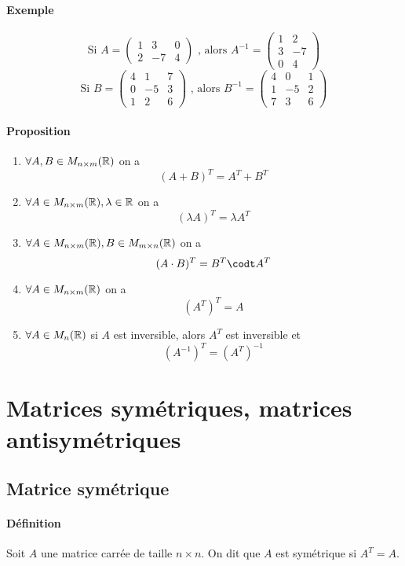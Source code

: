 \paragraph{Exemple}$$\text{Si } A=\begin{pmatrix}1&3&0\\2&-7&4\end{pmatrix}\text{ , alors }A^{-1}=\begin{pmatrix}1&2\\3&-7\\0&4\end{pmatrix}$$
$$\text{Si } B=\begin{pmatrix}4&1&7\\0&-5&3\\1&2&6\end{pmatrix}\text{ , alors }B^{-1}=\begin{pmatrix}4&0&1\\1&-5&2\\7&3&6\end{pmatrix}$$

\paragraph*{Proposition}
\begin{enumerate}[1)]
  \item $\forall A, B \in M_{n\times m}(\mathbb{R})$ on a
    $$(A + B)^{T} = A^{T} + B^{T}$$
  \item $\forall A \in M_{n\times m}(\mathbb{R}), \lambda \in \mathbb{R}$ on a
    $$(\lambda A)^{T} = \lambda A^{T}$$
  \item $\forall A \in M_{n\times m}(\mathbb{R}), B \in M_{m\times n}(\mathbb{R})$ on a
    $$(A \cdot B)^{T} = B^{T} \codt A^{T}$$
  \item $\forall A \in M_{n\times m}(\mathbb{R})$ on a
    $$(A^{T})^{T} = A$$
  \item $\forall A \in M_{n}(\mathbb{R})$ si $A$ est inversible, alors $A^{T}$ est inversible et 
    $$(A^{-1})^{T} = (A^{T})^{-1}$$
\end{enumerate}

%
%
\section{Matrices symétriques, matrices antisymétriques}
%
%
%
\subsection{Matrice symétrique}
%
\paragraph{Définition} Soit $A$ une matrice carrée de taille $n\times n$. On dit que $A$ est symétrique si $A^{T} = A$.

